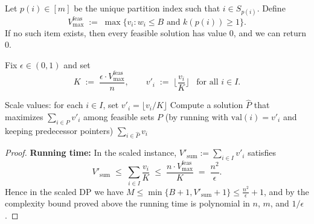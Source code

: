 Let $p(i)\in[m]$ be the unique partition index such that $i\in S_{p(i)}$. Define
\[
V_{\max}^{\text{feas}} \;:=\; \max\{v_i : w_i\le B \text{ and } k(p(i))\ge 1\}.
\]
If no such item exists, then every feasible solution has value $0$, and we can return $0$.

Fix $\epsilon\in(0,1)$ and set
\[
K \;:=\; \frac{\epsilon\cdot V_{\max}^{\text{feas}}}{n},
\qquad
v'_i \;:=\; \Big\lfloor \frac{v_i}{K}\Big\rfloor \;\;\; \text{for all } i\in I.
\]

\begin{algorithm}[H]
\caption{FPTAS for Knapsack with Partition Constraints}
    \begin{algorithmic}[1]
        \State Scale values: for each $i \in I$, set $v'_i = \lfloor v_i / K \rfloor$
        \State Compute a solution $\widehat{P}$ that maximizes $\sum_{i\in P} v'_i$ among feasible sets $P$
        \State \hspace{1em}(by running  with $\text{val}(i)=v'_i$ and keeping predecessor pointers)
        \State \Return $\sum_{i\in \widehat{P}} v_i$
    \EndFunction
    \end{algorithmic}
\end{algorithm}

\begin{proof}
    \textbf{Running time:} In the scaled instance, $V'_{\text{sum}}:=\sum_{i\in I} v'_i$ satisfies
    \[
    V'_{\text{sum}}
    \;\le\;
    \sum_{i\in I}\frac{v_i}{K}
    \;\le\;
    \frac{n\cdot V_{\max}^{\text{feas}}}{K}
    \;=\;
    \frac{n^2}{\epsilon}.
    \]
    Hence in the scaled DP we have $M\le \min\{B+1, V'_{\text{sum}}+1\}\le \frac{n^2}{\epsilon}+1$, and by the complexity bound proved above the running time is polynomial in $n$, $m$, and $1/\epsilon$.
\end{proof}

